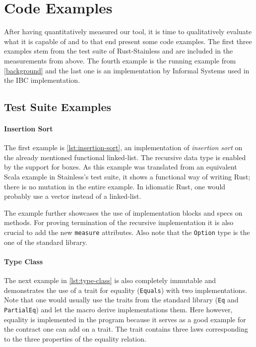 


\section{Code Examples}

After having quantitatively measured our tool, it is time to qualitatively
evaluate what it is capable of and to that end present some code examples. The
first three examples stem from the test suite of Rust-Stainless and are included
in the measurements from above. The fourth example is the running example from
\autoref{background} and the last one is an implementation by Informal Systems
used in the IBC implementation.

\subsection{Test Suite Examples}

\paragraph{Insertion Sort}

The first example is \autoref{lst:insertion-sort}, an implementation of
\emph{insertion sort} on the already mentioned functional linked-list. The
recursive data type is enabled by the support for boxes. As this example was
translated from an equivalent Scala example in Stainless's test suite, it shows
a functional way of writing Rust; there is no mutation in the entire example. In
idiomatic Rust, one would probably use a vector instead of a linked-list.

The example further showcases the use of implementation blocks and specs on
methods. For proving termination of the recursive implementation it is also
crucial to add the new \lstinline!measure! attributes. Also note that the
\lstinline!Option! type is the one of the standard library.

\paragraph{Type Class}

The next example in \autoref{lst:type-class} is also completely immutable and
demonstrates the use of a trait for equality (\lstinline!Equals!) with two
implementations. Note that one would usually use the traits from the standard
library (\lstinline!Eq! and \lstinline!PartialEq!) and let the macro derive
implementations them. Here however, equality is implemented in the program
because it serves as a good example for the contract one can add on a trait. The
trait contains three laws corresponding to the three properties of the equality
relation.

